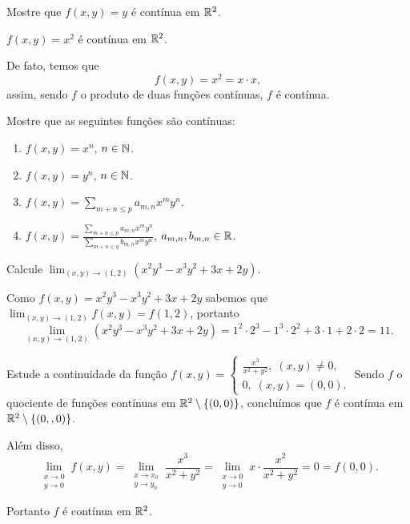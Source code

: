 \begin{exercise}
    Mostre que \(f(x,y) = y\) é contínua em \(\mathbb{R}^2\).
\end{exercise}

\begin{example}
    \(f(x,y) = x^2\) é contínua em \(\mathbb{R}^2\).

    De fato, temos que \[f(x,y) = x^2 = x\cdot x,\] assim, sendo \(f\) o produto de duas funções contínuas, \(f\) é contínua.
\end{example}

\begin{exercise}
    Mostre que as seguintes funções são contínuas:
        \begin{enumerate}
            \item \(f(x,y) = x^n\), \(n\in\mathbb{N}\).
            \item \(f(x,y) = y^n\), \(n\in\mathbb{N}\).
            \item \(f(x,y) = \sum_{m+n\leq p} a_{m,n} x^my^n.\)
            \item \(f(x,y) = \frac{\sum_{m+n\leq p} a_{m,n} x^my^n}{\sum_{m+n\leq q} b_{m,n} x^my^n}\), \(a_{m,n}, b_{m,n}\in\mathbb{R}\).
        \end{enumerate}
\end{exercise}

\begin{example}
    Calcule \(\lim_{(x,y) \to (1,2)} (x^2y^3 - x^3y^2 + 3x + 2y)\).

    Como \(f(x,y) = x^2y^3 - x^3y^2 + 3x + 2y\) sabemos que \(\lim_{(x,y)\to(1,2)} f(x,y) = f(1,2)\), portanto \[ \lim_{(x,y) \to (1,2)} (x^2y^3 - x^3y^2 + 3x + 2y) = 1^2\cdot 2^3 - 1^3\cdot 2^2 + 3\cdot 1 + 2\cdot 2 = 11. \]
\end{example}

\begin{example}
    Estude a continuidade da função \(f(x,y) = \begin{cases}
        \frac{x^3}{x^2 + y^2},\; (x,y)\neq 0, \\
        0,\; (x,y)=(0,0).
    \end{cases}\) Sendo \(f\) o quociente de funções contínuas em \(\mathbb{R}^2\setminus\{(0,0)\}\), concluímos que \(f\) é contínua em \(\mathbb{R}^2\setminus\{(0,,0)\}\).

    Além disso, \[\displaystyle\lim_{\substack{x\to 0 \\ y\to 0}} f(x,y) = \displaystyle\lim_{\substack{x\to x_0 \\ y\to y_0}} \frac{x^3}{x^2 + y^2} = \displaystyle\lim_{\substack{x\to 0 \\ y\to 0}} x\cdot \frac{x^2}{x^2+y^2} = 0 = f(0,0). \]

    Portanto \(f\) é contínua em \(\mathbb{R}^2\).
\end{example}

